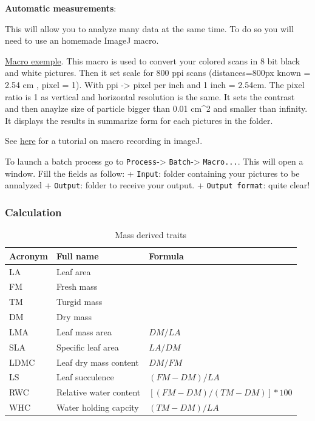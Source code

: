 \documentclass[
  12pt,
  american,
  a4paper,
  extrafontsizes,onecolumn,openright
  ]{memoir}
\begin{document}
\normalsize

\textbf{Automatic measurements}:

This will allow you to analyze many data at the same time.
To do so you will need to use an homemade ImageJ macro.

\href{document/software/ImageJ/macro.txt}{Macro exemple}.
This macro is used to convert your colored scans in 8 bit black and white pictures.
Then it set scale for 800 ppi scans (distances=800px known = 2.54 cm , pixel = 1).
With ppi -\textgreater{} pixel per inch and 1 inch = 2.54cm.
The pixel ratio is 1 as vertical and horizontal resolution is the same.
It sets the contrast and then anaylze size of particle bigger than 0.01 cm\^{}2 and smaller than infinity.
It displays the results in summarize form for each pictures in the folder.

See \href{https://exeter-data-analytics.github.io/imagej-gui/macros.html}{here} for a tutorial on macro recording in imageJ.

To launch a batch process go to \texttt{Process}-\textgreater{} \texttt{Batch}-\textgreater{} \texttt{Macro...}.
This will open a window.
Fill the fields as follow:
+ \texttt{Input}: folder containing your pictures to be annalyzed
+ \texttt{Output}: folder to receive your output.
+ \texttt{Output\ format}: quite clear!

\hypertarget{calculation}{%
\subsubsection{Calculation}\label{calculation}}

\scriptsize

\begin{table}

\caption{\label{tab:unnamed-chunk-1}Mass derived traits}
\centering
\begin{tabular}[t]{lll}
\toprule
Acronym & Full name & Formula\\
\midrule
LA & Leaf area & \\
FM & Fresh mass & \\
TM & Turgid mass & \\
DM & Dry mass & \\
LMA & Leaf mass area & $DM/LA$\\
\addlinespace
SLA & Specific leaf area & $LA/DM$\\
LDMC & Leaf dry mass content & $DM/FM$\\
LS & Leaf succulence & $(FM-DM)/LA$\\
RWC & Relative water content & $[(FM-DM)/(TM-DM)]*100$\\
WHC & Water holding capcity & $(TM-DM)/LA$\\
\bottomrule
\end{tabular}
\end{table}
\end{document}
